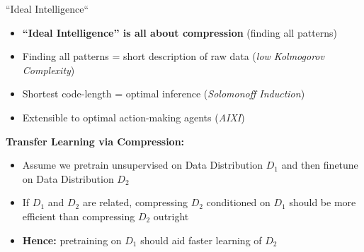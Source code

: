 \begin{frame}{``Ideal Intelligence``}
    \begin{itemize}
        \item \textbf{“Ideal Intelligence” is all about compression} (finding all patterns)
        \item Finding all patterns = short description of raw data (\textit{low Kolmogorov Complexity})
        \item Shortest code-length = optimal inference (\textit{Solomonoff Induction})
        \item Extensible to optimal action-making agents (\textit{AIXI})
    \end{itemize}
    \vspace{1em}
    \textbf{Transfer Learning via Compression:}
    \begin{itemize}
        \item Assume we pretrain unsupervised on Data Distribution $D_1$ and then finetune on Data Distribution $D_2$
        \item If $D_1$ and $D_2$ are related, compressing $D_2$ conditioned on $D_1$ should be more efficient than compressing $D_2$ outright
        \item \textbf{Hence:} pretraining on $D_1$ should aid faster learning of $D_2$
    \end{itemize}
\end{frame}